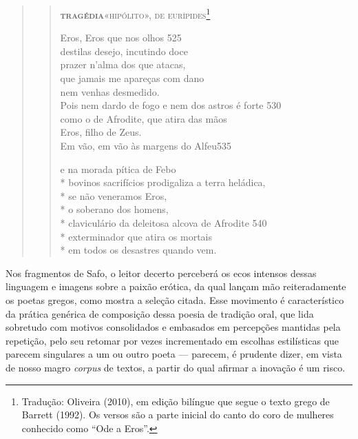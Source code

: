 \begin{quote}
\begin{verse}

\textsc{\textbf{tragédia}\quad «hipólito», de eurípides}\footnote{Tradução: Oliveira (2010), em edição bilíngue que segue o texto grego de Barrett (1992). Os versos são a parte inicial do canto do coro de mulheres conhecido como ``Ode a Eros''.}\\

\medskip

Eros, Eros que nos olhos \num{525}\\
destilas desejo, incutindo doce\\ 
prazer n’alma dos que atacas,\\
que jamais me apareças com dano\\
nem venhas desmedido.\\
Pois nem dardo de fogo e nem dos astros é forte \num{530}\\
como o de Afrodite, que atira das mãos\\
Eros, filho de Zeus.\\

Em vão, em vão às margens do Alfeu\num{535}\\

\medskip

e na morada pítica de Febo\\*
bovinos sacrifícios prodigaliza a terra heládica,\\*
se não veneramos Eros,\\*
o soberano dos homens,\\*
claviculário da deleitosa alcova de Afrodite \num{540}\\*
exterminador que atira os mortais\\*
em todos os desastres quando vem.
\end{verse}
\end{quote}



Nos fragmentos de Safo, o leitor decerto perceberá os ecos intensos
dessas linguagem e imagens sobre a paixão erótica, da qual lançam mão
reiteradamente os poetas gregos, como mostra a seleção citada. Esse movimento é
característico da prática genérica de composição dessa poesia de tradição oral, que lida sobretudo com motivos consolidados e embasados em
percepções mantidas pela repetição, pelo seu retomar por vezes incrementado em
escolhas estilísticas que parecem singulares a um ou outro poeta --- parecem, é
prudente dizer, em vista de nosso magro \emph{corpus} de textos, a partir do
qual afirmar a inovação é um risco.


